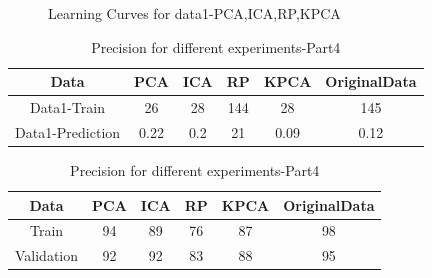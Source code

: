 \documentclass[12pt]{article}
\begin{document}
\begin{figure}[htbp]
    \centering
    \caption{Learning Curves for data1-PCA,ICA,RP,KPCA}
    \label{fig:foobar}
\end{figure}


 \begin{center}
  \begin{table}
 \begin{tabular}{|c| c| c| c|c|c|} 
  \hline
Data & PCA & ICA & RP & KPCA & OriginalData\\ [0.5ex] 
 \hline
 Data1-Train & 26 &28 &144 & 28& 145\\ 
 
 Data1-Prediction& 0.22&0.2 &21 & 0.09& 0.12 \\ [1ex] 
 \hline
\end{tabular}
\caption{\label{tab:table-name}Precision for different experiments-Part4}
\end{table}

\end{center}


\begin{center}
 \begin{table}
 \begin{tabular}{||c| c| c| c|c|c||} 
 \hline
Data & PCA & ICA & RP & KPCA & OriginalData\\ [0.5ex] 
 \hline\hline
 Train&94 & 89 & 76 &87 &98 \\ 
 \hline\hline
 Validation&92&92 & 83& 88& 95\\ [1ex] 
 \hline\hline

\end{tabular}
\caption{\label{tab:table-name}Precision for different experiments-Part4}
\end{table}

\end{center}
\end{document}
